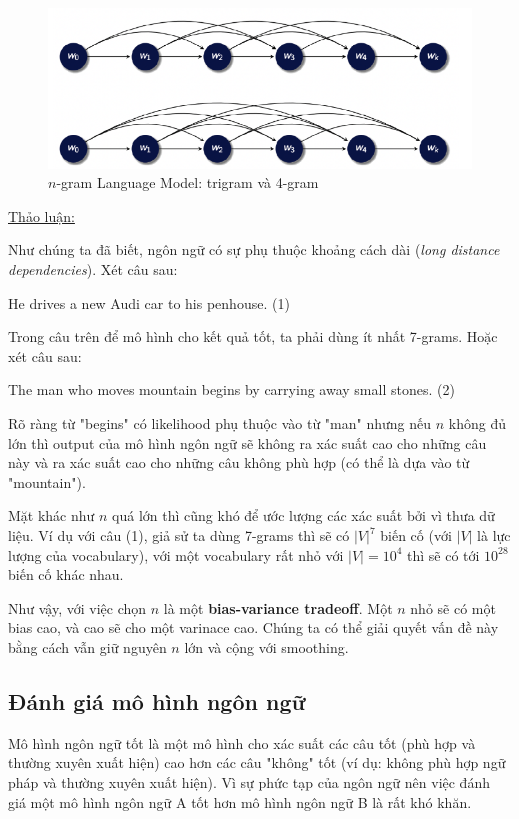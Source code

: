 \begin{figure}[H]
    \centering
    \includegraphics[width=13cm]{books/artificial-neural-network/chapter07/figure-sec12/ngram.png}
    \caption{$n$-gram Language Model: trigram và 4-gram}
    \label{fig:ngram}
\end{figure}

\underline{Thảo luận:}

Như chúng ta đã biết, ngôn ngữ có sự phụ thuộc khoảng cách dài (\textit{long distance dependencies}). Xét câu sau:

\begin{center}
He drives a new Audi car to his penhouse. (1)
\end{center}

Trong câu trên để mô hình cho kết quả tốt, ta phải dùng ít nhất 7-grams. Hoặc xét câu sau:
\begin{center}
The man who moves mountain begins by carrying away small stones. (2)
\end{center}

Rõ ràng từ "begins" có likelihood phụ thuộc vào từ "man" nhưng nếu $n$ không đủ lớn thì output của mô hình ngôn ngữ sẽ không ra xác suất cao cho những câu này và ra xác suất cao cho những câu không phù hợp (có thể là dựa vào từ "mountain").

Mặt khác như $n$ quá lớn thì cũng khó để ước lượng các xác suất bởi vì thưa dữ liệu. Ví dụ với câu (1), giả sử ta dùng 7-grams thì sẽ có $|V|^7$ biến cố (với $|V|$ là lực lượng của vocabulary), với một vocabulary rất nhỏ với $|V|=10^4$ thì sẽ có tới $10^{28}$ biến cố khác nhau.

Như vậy, với việc chọn $n$ là một \textbf{bias-variance tradeoff}. Một $n$ nhỏ sẽ có một bias cao, và cao sẽ cho một varinace cao. Chúng ta có thể giải quyết vấn đề này bằng cách vẫn giữ nguyên $n$ lớn và cộng với smoothing.

\subsection{Đánh giá mô hình ngôn ngữ}
Mô hình ngôn ngữ tốt là một mô hình cho xác suất các câu tốt (phù hợp và thường xuyên xuất hiện) cao hơn các câu "không" tốt (ví dụ: không phù hợp ngữ pháp và thường xuyên xuất hiện). Vì sự phức tạp của ngôn ngữ nên việc đánh giá một mô hình ngôn ngữ A tốt hơn mô hình ngôn ngữ B là rất khó khăn.

